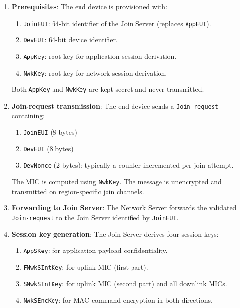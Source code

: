 \begin{enumerate}
    \item \textbf{Prerequisites}: The end device is provisioned with:
          \begin{enumerate}
              \item \texttt{JoinEUI}: 64-bit identifier of the Join Server (replaces \texttt{AppEUI}).
              \item \texttt{DevEUI}: 64-bit device identifier.
              \item \texttt{AppKey}: root key for application session derivation.
              \item \texttt{NwkKey}: root key for network session derivation.
          \end{enumerate}
          Both \texttt{AppKey} and \texttt{NwkKey} are kept secret and never transmitted.

    \item \textbf{Join-request transmission}: The end device sends a \texttt{Join-request} containing:
          \begin{enumerate}
              \item \texttt{JoinEUI} (8 bytes)
              \item \texttt{DevEUI} (8 bytes)
              \item \texttt{DevNonce} (2 bytes): typically a counter incremented per join attempt.
          \end{enumerate}
          The MIC is computed using \texttt{NwkKey}. The message is unencrypted and transmitted on region-specific join channels.

    \item \textbf{Forwarding to Join Server}: The Network Server forwards the validated \texttt{Join-request} to the Join Server identified by \texttt{JoinEUI}.

    \item \textbf{Session key generation}: The Join Server derives four session keys:
          \begin{enumerate}
              \item \texttt{AppSKey}: for application payload confidentiality.
              \item \texttt{FNwkSIntKey}: for uplink MIC (first part).
              \item \texttt{SNwkSIntKey}: for uplink MIC (second part) and all downlink MICs.
              \item \texttt{NwkSEncKey}: for MAC command encryption in both directions.
          \end{enumerate}


\end{enumerate}
